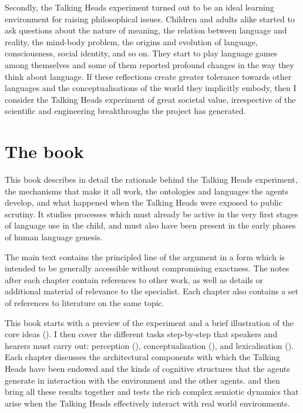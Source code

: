Secondly, the Talking Heads experiment turned out to be 
an ideal learning environment for raising philosophical
issues. Children and adults alike
started to ask questions about the nature of
meaning, the relation between language
and reality, the mind-body problem, 
the origins and evolution of language, 
consciousness, social identity, and so on. They 
start to play language games among themselves and some of
them reported profound changes in the way they 
think about language. If these reflections create 
greater tolerance towards other languages and 
the conceptualisations of the world
they implicitly embody, then I consider the
Talking Heads experiment of great societal value, irrespective of
the scientific and engineering breakthroughs
the project has generated. 

\section{The book}

This book describes in detail the rationale behind the 
Talking Heads experiment, the mechanisms that make it
all work, the ontologies and 
languages the agents develop, and what happened
when the Talking Heads were exposed to public scrutiny. 
It studies processes which must already be active in the 
very first stages of language use in the child, and 
must also have been present in the early phases of 
human language genesis. 

The main text contains the
principled line of the argument in a form which is intended to be generally
accessible without compromising exactness. The notes after
each chapter contain references to other work, as well 
as details or additional material of relevance to the 
specialist. Each chapter also contains a set of references to
literature on the same topic. 

This book starts with a preview of the 
experiment and a brief illustration of the core ideas (). 
I then cover the 
different tasks step-by-step that speakers and hearers must carry out: 
perception (), conceptualisation (), 
and lexicalisation (). Each 
chapter discusses the 
architectural components with which the Talking Heads 
have been endowed and the kinds of cognitive structures that 
the agents generate in interaction with the environment 
and the other agents.  and  then bring all these 
results together and tests the rich complex semiotic dynamics that 
arise when the Talking Heads effectively interact 
with real world environments. 

